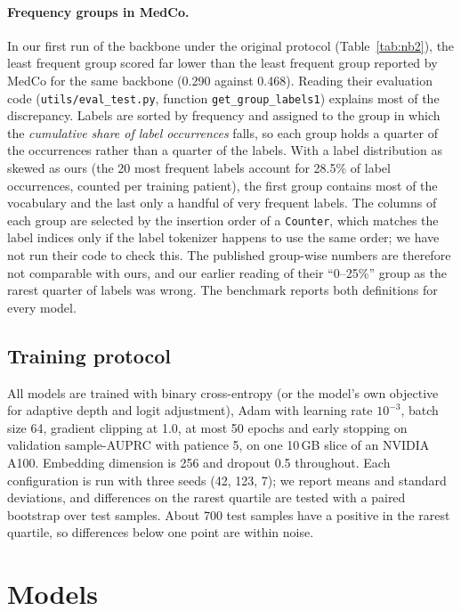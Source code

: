 \documentclass[11pt]{article}
\newcommand{\nb}[1]{\texttt{#1}}
\begin{document}
\paragraph{Frequency groups in MedCo.} In our first run of the backbone under the original protocol
(Table~\ref{tab:nb2}), the least frequent group scored far lower than the least frequent group reported by MedCo for
the same backbone (0.290 against 0.468). Reading their
evaluation code (\nb{utils/eval\_test.py}, function \nb{get\_group\_labels1}) explains most of the
discrepancy. Labels are sorted by frequency and assigned to the group in which the \emph{cumulative share of
label occurrences} falls, so each group holds a quarter of the occurrences rather than a quarter of the
labels. With a label distribution as skewed as ours (the 20 most frequent labels account for 28.5\% of
label occurrences, counted per training patient), the first group contains most of the vocabulary and the last only a handful of very frequent
labels. The columns of each group are selected by the insertion order of a \texttt{Counter}, which matches the label indices only if the label tokenizer happens to use the same
order; we have not run their code to check this. The published group-wise numbers are therefore not comparable
with ours, and our earlier reading of their ``0--25\%'' group as the rarest quarter of labels was wrong.
The benchmark reports both definitions for every model.


\subsection{Training protocol}

All models are trained with binary cross-entropy (or the model's own objective for adaptive depth and logit
adjustment), Adam with learning rate $10^{-3}$, batch size 64, gradient clipping at 1.0, at most 50 epochs and early
stopping on validation sample-AUPRC with patience 5, on one 10\,GB slice of an NVIDIA A100. Embedding dimension
is 256 and dropout 0.5 throughout. Each configuration is run with three seeds (42, 123, 7); we report means and
standard deviations, and differences on the rarest quartile are tested with a paired bootstrap over test samples.
About 700 test samples have a positive in the rarest quartile, so differences below one point are within noise.

\section{Models}\label{sec:models}
\end{document}
